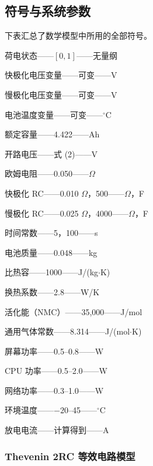 \documentclass[11pt,a4paper]{ctexart}
\begin{document}
\subsection{符号与系统参数}

下表汇总了数学模型中所用的全部符号。

\begin{description}[leftmargin=7.6em,itemsep=0.1em,parsep=0.02em]
\item[\textit{状态变量}]
\item[$SOC(t)$] 荷电状态——$[0,1]$——无量纲
\item[$V_1(t)$] 快极化电压变量——可变——V
\item[$V_2(t)$] 慢极化电压变量——可变——V
\item[$T(t)$] 电池温度变量——可变——$^{\circ}$C
\item[\textit{电气参数}]
\item[$Q_{nom}$] 额定容量——4.422——Ah
\item[$V_{oc}(SOC)$] 开路电压——式 (2)——V
\item[$R_0$] 欧姆电阻——0.050——$\Omega$
\item[$R_1,\ C_1$] 快极化 RC——0.010 $\Omega$，500——$\Omega$，F
\item[$R_2,\ C_2$] 慢极化 RC——0.025 $\Omega$，4000——$\Omega$，F
\item[$\tau_1,\ \tau_2$] 时间常数——5，100——s
\item[\textit{热参数}]
\item[$m$] 电池质量——0.048——kg
\item[$c$] 比热容——1000——J/(kg$\cdot$K)
\item[$h$] 换热系数——2.8——W/K
\item[$E_a$] 活化能（NMC）——35,000——J/mol
\item[$R_g$] 通用气体常数——8.314——J/(mol$\cdot$K)
\item[\textit{输入参数}]
\item[$P_{screen}$] 屏幕功率——0.5--0.8——W
\item[$P_{cpu}$] CPU 功率——0.5--2.0——W
\item[$P_{net}$] 网络功率——0.3--1.0——W
\item[$T_{amb}$] 环境温度——$-20$--45——$^{\circ}$C
\item[$I(t)$] 放电电流——计算得到——A
\end{description}

\subsubsection{Thevenin 2RC 等效电路模型}
\end{document}
